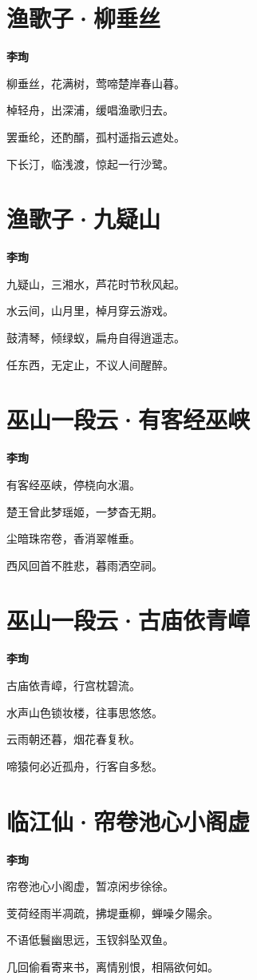 \documentclass[12pt,a4paper]{ctexbook}
\begin{document}
\section{渔歌子·柳垂丝}
\textbf{李珣}\par\vspace{0.5em}
柳垂丝，花满树，莺啼楚岸春山暮。\par
棹轻舟，出深浦，缓唱渔歌归去。\par
罢垂纶，还酌醑，孤村遥指云遮处。\par
下长汀，临浅渡，惊起一行沙鹭。\par

\section{渔歌子·九疑山}
\textbf{李珣}\par\vspace{0.5em}
九疑山，三湘水，芦花时节秋风起。\par
水云间，山月里，棹月穿云游戏。\par
鼓清琴，倾绿蚁，扁舟自得逍遥志。\par
任东西，无定止，不议人间醒醉。\par

\section{巫山一段云·有客经巫峡}
\textbf{李珣}\par\vspace{0.5em}
有客经巫峡，停桡向水湄。\par
楚王曾此梦瑶姬，一梦杳无期。\par
尘暗珠帘卷，香消翠帷垂。\par
西风回首不胜悲，暮雨洒空祠。\par

\section{巫山一段云·古庙依青嶂}
\textbf{李珣}\par\vspace{0.5em}
古庙依青嶂，行宫枕碧流。\par
水声山色锁妆楼，往事思悠悠。\par
云雨朝还暮，烟花春复秋。\par
啼猿何必近孤舟，行客自多愁。\par

\section{临江仙·帘卷池心小阁虚}
\textbf{李珣}\par\vspace{0.5em}
帘卷池心小阁虚，暂凉闲步徐徐。\par
芰荷经雨半凋疏，拂堤垂柳，蝉噪夕陽余。\par
不语低鬟幽思远，玉钗斜坠双鱼。\par
几回偷看寄来书，离情别恨，相隔欲何如。\par
\end{document}
